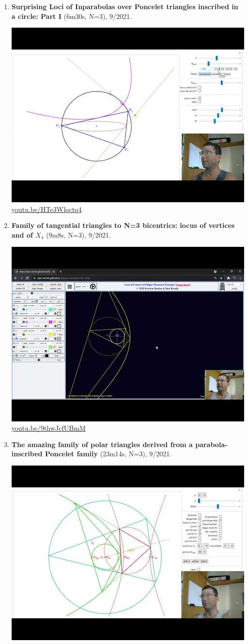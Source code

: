 \documentclass[12pt]{amsart}
\begin{document}
\begin{enumerate}[resume]
\item \textbf{Surprising Loci of Inparabolas over Poncelet triangles inscribed in a circle: Part I} (6m30s, N=3), 9/2021. 
\begin{center}\includegraphics[width=.5\textwidth]{pics/HTe3Wlqctq4.jpg} \\ 
\href{https://youtu.be/HTe3Wlqctq4}{\url{youtu.be/HTe3Wlqctq4}}\end{center}
% 
\item \textbf{Family of tangential triangles to N=3 bicentrics: locus of vertices and of $X_{4}$} (9m8s, N=3), 9/2021. 
\begin{center}\includegraphics[width=.5\textwidth]{pics/9thwJcfUBmM.jpg} \\ 
\href{https://youtu.be/9thwJcfUBmM}{\url{youtu.be/9thwJcfUBmM}}\end{center}
% 
\item \textbf{The amazing family of polar triangles derived from a parabola-inscribed Poncelet family} (23m14s, N=3), 9/2021. 
\begin{center}\includegraphics[width=.5\textwidth]{pics/L2UpEHFQ6CY.jpg} \\ 

\end{center}
\end{enumerate}
\end{document}
